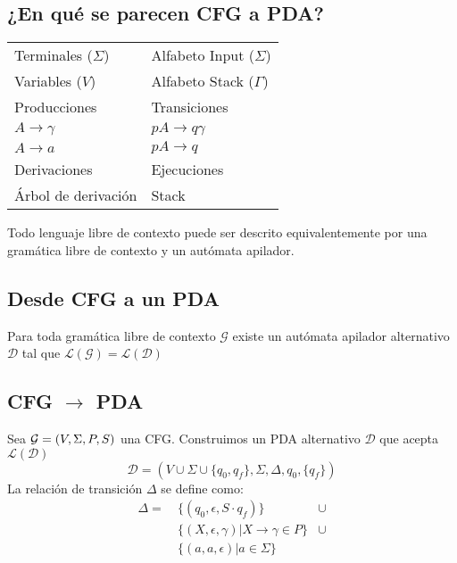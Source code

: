 \documentclass[a4paper,twoside,master.tex]{article}
\begin{document}

\subsection*{¿En qué se parecen CFG a PDA?}

\begin{table*}[ht]
    \centering
    \begin{tabular}{ll}
        Terminales ($\Sigma$) & Alfabeto Input ($\Sigma$) \\
        Variables ($V$)       & Alfabeto Stack ($\Gamma$) \\
        Producciones          & Transiciones              \\
        $A \to \gamma$        & $pA \to q\gamma$          \\
        $A \to a$             & $pA \to q$                \\
        Derivaciones          & Ejecuciones               \\
        Árbol de derivación   & Stack
    \end{tabular}
\end{table*}

\begin{teorema}
    Todo lenguaje libre de contexto puede ser descrito equivalentemente por una gramática libre de contexto y un autómata apilador.
\end{teorema}

\subsection*{Desde CFG a un PDA}

\begin{teorema}
    Para toda gramática libre de contexto $\mathcal{G}$ existe un autómata apilador alternativo $\mathcal{D}$ tal que $\mathcal{L}(\mathcal{G}) = \mathcal{L}(\mathcal{D})$
\end{teorema}

\subsection*{CFG $\to$ PDA}
Sea $\mathcal{G} = (V, \Sigma, P, S)$ una CFG. Construimos un PDA alternativo $\mathcal{D}$ que acepta $\mathcal{L}(\mathcal{D})$
$$\mathcal{D} = (V \cup \Sigma \cup \{  q_0, q_f \}, \Sigma, \Delta, q_0, \{ q_f \})$$
La relación de transición $\Delta$ se define como:
\begin{align}
    \Delta = \  & \{ (q_0, \epsilon, S \cdot q_f) \}               & \cup \\
                & \{ (X, \epsilon, \gamma) | X \to \gamma \in P \} & \cup \\
                & \{ (a, a, \epsilon) | a \in \Sigma \}
\end{align}
\end{document}
